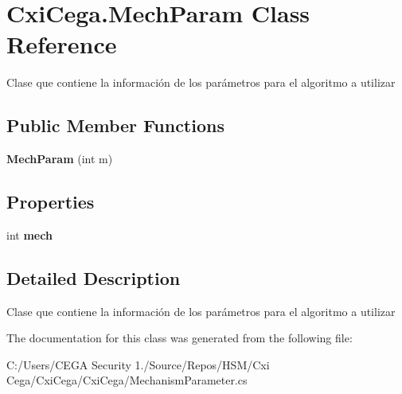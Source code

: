 \section{Cxi\+Cega.\+Mech\+Param Class Reference}
\label{class_cxi_cega_1_1_mech_param}


Clase que contiene la información de los parámetros para el algoritmo a utilizar  


\subsection*{Public Member Functions}
\begin{DoxyCompactItemize}
\item 
\mbox{\label{class_cxi_cega_1_1_mech_param_a07cc6ad993ab5036980a67c8083722fd}} 
{\bfseries Mech\+Param} (int m)
\end{DoxyCompactItemize}
\subsection*{Properties}
\begin{DoxyCompactItemize}
\item 
\mbox{\label{class_cxi_cega_1_1_mech_param_ad06d1be529059af603b733e52cf24b7e}} 
int {\bfseries mech}\hspace{0.3cm}{\ttfamily  [get, set]}
\end{DoxyCompactItemize}


\subsection{Detailed Description}
Clase que contiene la información de los parámetros para el algoritmo a utilizar 



The documentation for this class was generated from the following file\+:\begin{DoxyCompactItemize}
\item 
C\+:/\+Users/\+C\+E\+G\+A Security 1./\+Source/\+Repos/\+H\+S\+M/\+Cxi Cega/\+Cxi\+Cega/\+Cxi\+Cega/Mechanism\+Parameter.\+cs\end{DoxyCompactItemize}
